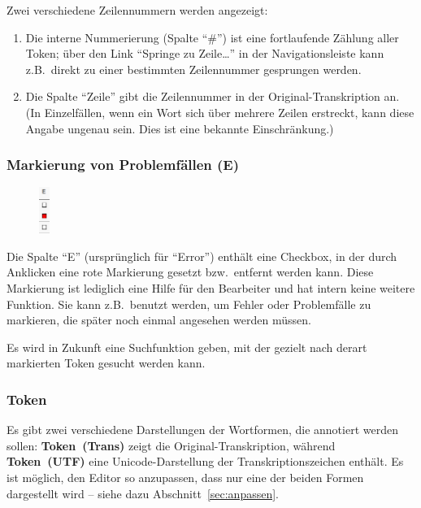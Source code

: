 \documentclass[11pt,a4paper,parskip=half]{scrartcl}
\begin{document}
Zwei verschiedene Zeilennummern werden angezeigt:
\begin{enumerate}
\item Die interne Nummerierung (Spalte "`\#"') ist eine fortlaufende
  Zählung aller Token; über den Link "`Springe zu Zeile\ldots"' in der
  Navigationsleiste kann z.B.\ direkt zu einer bestimmten Zeilennummer
  gesprungen werden.
\item Die Spalte "`Zeile"' gibt die Zeilennummer in der
  Original-Transkription an. (In Einzelfällen, wenn ein Wort sich über
  mehrere Zeilen erstreckt, kann diese Angabe ungenau sein. Dies ist
  eine bekannte Einschränkung.)
\end{enumerate}

\newpage %
\subsubsection{Markierung von Problemfällen (E)}

\begin{figure}
  \begin{center}\vspace{-2em}
    \includegraphics[width=0.031\textwidth]{img/error.png}
  \end{center}
\end{figure}

Die Spalte "`E"' (ursprünglich für "`Error"') enthält eine Checkbox,
in der durch Anklicken eine rote Markierung gesetzt bzw.\ entfernt
werden kann.  Diese Markierung ist lediglich eine Hilfe für den
Bearbeiter und hat intern keine weitere Funktion.  Sie kann z.B.\
benutzt werden, um Fehler oder Problemfälle zu markieren, die später
noch einmal angesehen werden müssen.

Es wird in Zukunft eine Suchfunktion geben, mit der gezielt nach
derart markierten Token gesucht werden kann.

\subsubsection{Token}

Es gibt zwei verschiedene Darstellungen der Wortformen, die annotiert
werden sollen: \textbf{Token~(Trans)} zeigt die
Original-Transkription, während \textbf{Token~(UTF)} eine
Unicode-Darstellung der Transkriptionszeichen enthält.  Es ist
möglich, den Editor so anzupassen, dass nur eine der beiden Formen
dargestellt wird -- siehe dazu Abschnitt~\ref{sec:anpassen}.
\end{document}
